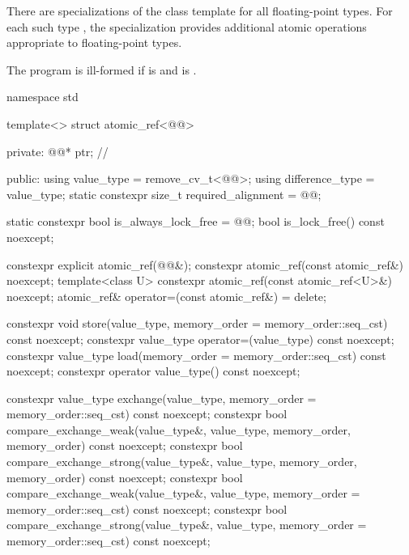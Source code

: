 \pnum
{}%
There are specializations of the  class template
for all floating-point types.
For each such type ,
the specialization  provides
additional atomic operations appropriate to floating-point types.

\pnum
The program is ill-formed
if  is  and
 is .

\begin{codeblock}
namespace std {
  template<> struct atomic_ref<@@> {
  private:
    @@* ptr;   // \expos

  public:
    using value_type = remove_cv_t<@@>;
    using difference_type = value_type;
    static constexpr size_t required_alignment = @@;

    static constexpr bool is_always_lock_free = @@;
    bool is_lock_free() const noexcept;

    constexpr explicit atomic_ref(@@&);
    constexpr atomic_ref(const atomic_ref&) noexcept;
    template<class U>
      constexpr atomic_ref(const atomic_ref<U>&) noexcept;
    atomic_ref& operator=(const atomic_ref&) = delete;

    constexpr void store(value_type,
                         memory_order = memory_order::seq_cst) const noexcept;
    constexpr value_type operator=(value_type) const noexcept;
    constexpr value_type load(memory_order = memory_order::seq_cst) const noexcept;
    constexpr operator value_type() const noexcept;

    constexpr value_type exchange(value_type,
                                  memory_order = memory_order::seq_cst) const noexcept;
    constexpr bool compare_exchange_weak(value_type&, value_type,
                                         memory_order, memory_order) const noexcept;
    constexpr bool compare_exchange_strong(value_type&, value_type,
                                           memory_order, memory_order) const noexcept;
    constexpr bool compare_exchange_weak(value_type&, value_type,
                                         memory_order = memory_order::seq_cst) const noexcept;
    constexpr bool compare_exchange_strong(value_type&, value_type,
                                           memory_order = memory_order::seq_cst) const noexcept;

}}
\end{codeblock}
